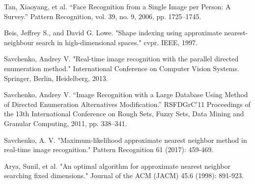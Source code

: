\cleardoublepage
{}
{}
\begin{thebibliography}{99}
Tan, Xiaoyang, et al. “Face Recognition from a Single Image per Person: A Survey.” Pattern Recognition, vol. 39, no. 9, 2006, pp. 1725–1745.

Beis, Jeffrey S., and David G. Lowe. "Shape indexing using approximate nearest-neighbour search in high-dimensional spaces." cvpr. IEEE, 1997.

Savchenko, Andrey V. "Real-time image recognition with the parallel directed enumeration method." International Conference on Computer Vision Systems. Springer, Berlin, Heidelberg, 2013.

Savchenko, Andrey V. “Image Recognition with a Large Database Using Method of Directed Enumeration Alternatives Modification.” RSFDGrC’11 Proceedings of the 13th International Conference on Rough Sets, Fuzzy Sets, Data Mining and Granular Computing, 2011, pp. 338–341.

Savchenko, A. V. "Maximum-likelihood approximate nearest neighbor method in real-time image recognition." Pattern Recognition 61 (2017): 459-469.

Arya, Sunil, et al. "An optimal algorithm for approximate nearest neighbor searching fixed dimensions." Journal of the ACM (JACM) 45.6 (1998): 891-923.
\end{thebibliography}
